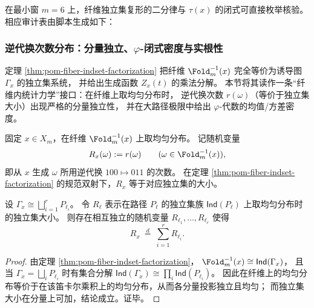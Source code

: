 \begin{remark}\label{rem:pom-fiber-indcomplex-audit-m6}
在最小窗 \(m=6\) 上，纤维独立集复形的二分律与 \(\tau(x)\) 的闭式可直接枚举核验。
相应审计表由脚本生成如下：

\end{remark}

\subsubsection{逆代换次数分布：分量独立、\texorpdfstring{$\varphi$}{phi}-闭式密度与实根性}\label{subsubsec:pom-fiber-rewrite-statistics}

定理 \ref{thm:pom-fiber-indset-factorization} 把纤维 \(\Fold_m^{-1}(x)\) 完全等价为诱导图 \(\Gamma_x\) 的独立集系统，
并给出生成函数 \(Z_x(t)\) 的乘法分解。
本节将其读作一条“纤维内统计力学”接口：在纤维上取均匀分布时，
逆代换次数 \(r(\omega)\)（等价于独立集大小）出现严格的分量独立性，
并在大路径极限中给出 \(\varphi\)-代数的均值/方差密度。

\begin{definition}[纤维内逆代换次数随机变量]\label{def:pom-fiber-rewrite-rv}
固定 \(x\in X_m\)，在纤维 \(\Fold_m^{-1}(x)\) 上取均匀分布。
记随机变量
\[
R_x(\omega):=r(\omega)\qquad(\omega\in\Fold_m^{-1}(x)),
\]
即从 \(x\) 生成 \(\omega\) 所用逆代换 \(100\mapsto 011\) 的次数。
在定理 \ref{thm:pom-fiber-indset-factorization} 的规范双射下，\(R_x\) 等于对应独立集的大小。
\end{definition}

\begin{proposition}\label{prop:pom-fiber-rewrite-independent-sum}
设 \(\Gamma_x\cong\bigsqcup_{i=1}^r P_{\ell_i}\)。
令 \(R_{\ell}\) 表示在路径 \(P_{\ell}\) 的独立集族 \(\mathsf{Ind}(P_{\ell})\) 上取均匀分布时的独立集大小。
则存在相互独立的随机变量 \(R_{\ell_1},\dots,R_{\ell_r}\) 使得
\[
R_x\ \overset{d}{=}\ \sum_{i=1}^r R_{\ell_i}.
\]
\end{proposition}
\begin{proof}
由定理 \ref{thm:pom-fiber-indset-factorization}，
\(
\Fold_m^{-1}(x)\cong \mathsf{Ind}(\Gamma_x)
\)，
且当 \(\Gamma_x=\bigsqcup_i P_{\ell_i}\) 时有集合分解
\(
\mathsf{Ind}(\Gamma_x)\cong \prod_i \mathsf{Ind}(P_{\ell_i})
\)。
因此在纤维上的均匀分布等价于在该笛卡尔乘积上的均匀分布，从而各分量投影独立且均匀；
而独立集大小在分量上可加，结论成立。证毕。
\end{proof}

